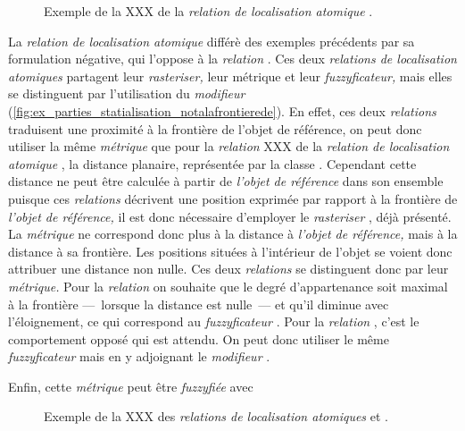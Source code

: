\begin{figure}
  \centering  
  \caption{Exemple de la XXX de la \emph{relation de localisation
      atomique} \protect{}.}
  \label{fig:ex_parties_statialisation_dansplani}
\end{figure}

La \emph{relation de localisation atomique}
 différè des exemples
précédents par sa formulation négative, qui l'oppose à la
\emph{relation} . Ces deux
\emph{relations de localisation atomiques} partagent leur
\emph{rasteriser,} leur métrique et leur \emph{fuzzyficateur,} mais
elles se distinguent par l'utilisation du \emph{modifieur}
(\autoref{fig:ex_parties_statialisation_notalafrontierede}). En effet,
ces deux \emph{relations} traduisent une proximité à la frontière de
l'objet de référence, on peut donc utiliser la même \emph{métrique}
que pour la \emph{relation} XXX de la \emph{relation de localisation
  atomique} \protect{}, la
distance planaire, représentée par la classe
. Cependant cette distance ne peut être calculée à
partir de \emph{l'objet de référence} dans son ensemble puisque ces
\emph{relations} décrivent une position exprimée par rapport à la
frontière de \emph{l'objet de référence,} il est donc nécessaire
d'employer le \emph{rasteriser} , déjà
présenté. La \emph{métrique} ne correspond donc plus à la distance à
\emph{l'objet de référence,} mais à la distance à sa frontière. Les
positions situées à l'intérieur de l'objet se voient donc attribuer
une distance non nulle. Ces deux \emph{relations} se distinguent donc
par leur \emph{métrique.} Pour la \emph{relation}
 on souhaite que le degré
d'appartenance soit maximal à la frontière ---~lorsque la distance
est nulle~--- et qu'il diminue avec l'éloignement, ce qui correspond
au \emph{fuzzyficateur} . Pour la
\emph{relation} , c'est le
comportement opposé qui est attendu. On peut donc utiliser le même
\emph{fuzzyficateur} mais en y adjoignant le \emph{modifieur}
. 

Enfin, cette \emph{métrique} peut être
\emph{fuzzyfiée} avec 

\begin{figure}
  \centering  
  \caption{Exemple de la XXX des \emph{relations de localisation
      atomiques} \protect{} et
    \protect{}.}
  \label{fig:ex_parties_statialisation_notalafrontierede}
\end{figure}

